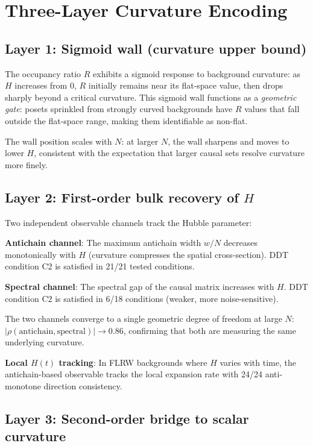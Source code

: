 \documentclass[12pt,a4paper]{article}
\begin{document}
\section{Three-Layer Curvature Encoding}

\subsection{Layer 1: Sigmoid wall (curvature upper bound)}

The occupancy ratio $R$ exhibits a sigmoid response to background curvature:
as $H$ increases from 0, $R$ initially remains near its flat-space value, then
drops sharply beyond a critical curvature.
This sigmoid wall functions as a \emph{geometric gate}: posets sprinkled from
strongly curved backgrounds have $R$ values that fall outside the flat-space
range, making them identifiable as non-flat.

The wall position scales with $N$: at larger $N$, the wall sharpens and moves
to lower $H$, consistent with the expectation that larger causal sets resolve
curvature more finely.

\subsection{Layer 2: First-order bulk recovery of $H$}

Two independent observable channels track the Hubble parameter:

\textbf{Antichain channel}: The maximum antichain width $w/N$ decreases
monotonically with $H$ (curvature compresses the spatial cross-section).
DDT condition C2 is satisfied in 21/21 tested conditions.

\textbf{Spectral channel}: The spectral gap of the causal matrix increases
with $H$.
DDT condition C2 is satisfied in 6/18 conditions (weaker, more noise-sensitive).

The two channels converge to a single geometric degree of freedom at large $N$:
$|\rho(\text{antichain}, \text{spectral})|\to 0.86$, confirming that both are
measuring the same underlying curvature.

\textbf{Local $H(t)$ tracking}: In FLRW backgrounds where $H$ varies with time,
the antichain-based observable tracks the local expansion rate with 24/24
anti-monotone direction consistency.

\subsection{Layer 3: Second-order bridge to scalar curvature}
\end{document}
